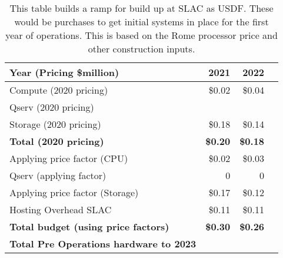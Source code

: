 \tiny \begin{longtable} { |p{}  |r  |r  |r |} 
\caption{This table builds a ramp for build up at SLAC as USDF. These would be purchases to get initial systems in place for the first year of operations. This is based on the Rome processor price and other construction inputs. \label{tab:preOps}}\\ 
\hline 
\textbf{Year (Pricing \$million)}&\textbf{2021}&\textbf{2022} \\ \hline
{Compute (2020 pricing)}&{\$0.02}&{\$0.04} \\ \hline
{Qserv (2020 pricing)}&{}&{} \\ \hline
{Storage (2020 pricing)}&{\$0.18}&{\$0.14} \\ \hline
\textbf{Total (2020 pricing)}&\textbf{\$0.20}&\textbf{\$0.18} \\ \hline
{Applying price factor (CPU)}&{\$0.02}&{\$0.03} \\ \hline
{Qserv (applying factor)}&{0}&{0} \\ \hline
{Applying price factor (Storage)}&{\$0.17}&{\$0.12} \\ \hline
{Hosting Overhead SLAC}&{\$0.11}&{\$0.11} \\ \hline
\textbf{Total budget (using price factors)}&\textbf{\$0.30}&\textbf{\$0.26} \\ \hline
\textbf{Total Pre Operations hardware to 2023}&& \\ \hline
\end{longtable} \normalsize
